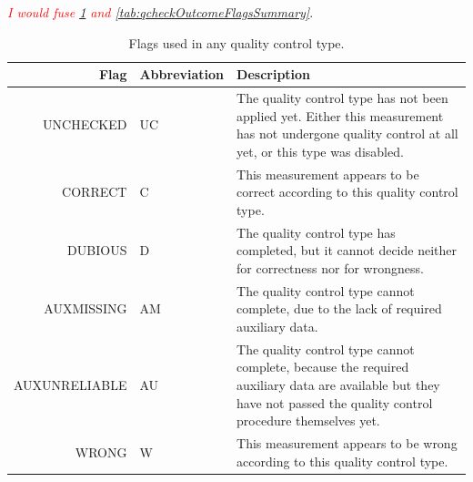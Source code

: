 \documentclass[authoryear,preprint,review,12pt]{elsarticle}
\newcommand{\note}[1]{\emph{\textcolor{red}{#1}}}
\begin{document}
\note{I would fuse \cref{tab:flagsSummary} and \cref{tab:qcheckOutcomeFlagsSummary}}.

\begin{table}[]
    \begin{scriptsize}
    \centering
    \begin{tabular}{r l p{10cm}}
    \hline
    Flag & Abbreviation & Description \\
    \hline
	UNCHECKED     & UC & The quality control type has not been applied yet. Either this measurement has not undergone quality control at all yet, or this type was disabled.\\
	CORRECT       & C  & This measurement appears to be correct according to this quality control type. \\
	DUBIOUS       & D  & The quality control type has completed, but it cannot decide neither for correctness nor for wrongness. \\
	AUXMISSING    & AM & The quality control type cannot complete, due to the lack of required auxiliary data. \\
	AUXUNRELIABLE & AU & The quality control type cannot complete, because the required auxiliary data are available but they have not passed the quality control procedure themselves yet. \\
	WRONG         & W  & This measurement appears to be wrong according to this quality control type. \\
    \hline
    \end{tabular}
    \caption{Flags used in any quality control type.}
    \label{tab:flagsSummary}
    \end{scriptsize}
\end{table}
\end{document}
